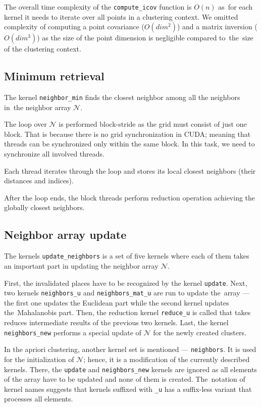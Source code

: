 \begin{rem}
The overall time complexity of the \texttt{compute\_icov} function is $O(n)$ as~for each kernel it needs to iterate over all points in a clustering context. We omitted complexity of computing a point covariance ($O(dim^2)$) and a matrix inversion ($O(dim^3)$) as the size of the point dimension is negligible compared to~the~size of the clustering context.
\end{rem}

\subsection{Minimum retrieval}

The kernel \texttt{neighbor\_min} finds the closest neighbor among all the neighbors in~the neighbor array $\mathcal{N}$.

The loop over $\mathcal{N}$ is performed block-stride as the grid must consist of just one block. That is because there is no grid synchronization in CUDA; meaning that threads can be synchronized only within the same block. In this task, we need to synchronize all involved threads.

Each thread iterates through the loop and stores its local closest neighbors (their distances and indices).

After the loop ends, the block threads perform reduction operation achieving the globally closest neighbors.

\subsection{Neighbor array update}


The kernels \texttt{update\_neighbors} is a set of five kernels where each of them takes an important part in updating the neighbor array $\mathcal{N}$.

First, the invalidated places have to be recognized by the kernel \texttt{update}. Next, two kernels \texttt{neighbors\_u} and \texttt{neighbors\_mat\_u} are run to update the~array --- the first one updates the Euclidean part while the second kernel updates the~Mahalanobis part. Then, the reduction kernel \texttt{reduce\_u} is called that takes reduces intermediate results of the previous two kernels. Last, the kernel \texttt{neighbors\_new} performs a special update of $\mathcal{N}$ for the newly created clusters.

In the apriori clustering, another kernel set is mentioned ---  \texttt{neighbors}. It is used for the initialization of $\mathcal{N}$; hence, it is a modification of the currently described kernels. There, the \texttt{update} and \texttt{neighbors\_new} kernels are ignored as all elements of the array have to be updated and none of them is created. The~notation of kernel names suggests that kernels suffixed with \texttt{\_u} has a suffix-less variant that processes all elements.

